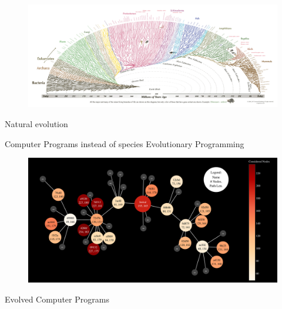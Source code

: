 \documentclass[aspectratio=169]{beamer}
\makeatletter
\renewcommand{\emph}[1]{{\Huge \color{pureminimalistic@text@red} #1}}
\newcommand{\red}[1]{{\color{pureminimalistic@text@red} #1}}
\makeatother
\begin{document}
{
\begin{frame}[plain]
  \begin{figure}
  \centering
  \includegraphics[width=1.0\linewidth,keepaspectratio]{figures/tree_of_life.png}
  \end{figure}
  \begin{center}
      \emph{Natural evolution}
  \end{center}
\end{frame}
}

\begin{frame}[plain]{}
  \centering
  \vfill
  \red{\fontsize{40}{50}\selectfont Computer Programs instead of species}
  \vfill
  \Huge Evolutionary Programming
\end{frame}

\begin{frame}[plain]
  \begin{figure}
  \centering
  \includegraphics[width=1.0\linewidth,keepaspectratio]{figures/tree.pdf}
  \end{figure}
  \begin{center}
  \emph{Evolved Computer Programs}
  \end{center}
\end{frame}
\end{document}
